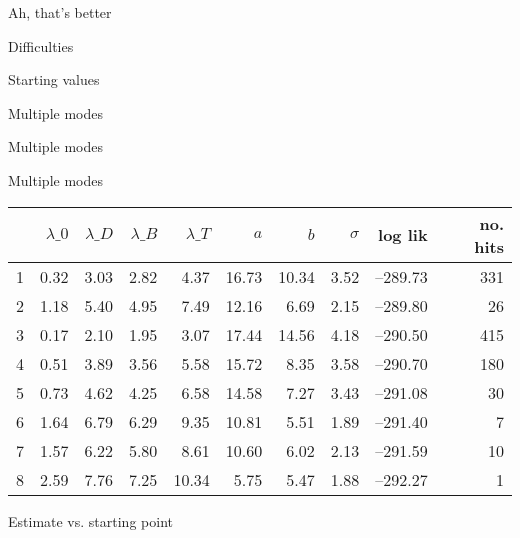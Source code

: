 \documentclass[aspectratio=169,12pt,t]{beamer}
\begin{document}
\begin{frame}{Ah, that's better}
\end{frame}


\begin{frame}{Difficulties}

\bbi
\item Starting values
\item Multiple modes
\ei

\end{frame}




\begin{frame}[c]{Multiple modes}
\end{frame}




\begin{frame}[c]{Multiple modes}

\centering
\renewcommand{\arraystretch}{1.3}
\begin{tabular}{rrrrrrrrrr}
  \hline
 & $\lambda\_0$ & $\lambda\_D$ & $\lambda\_B$ & $\lambda\_T$ & $a$ &
  $b$ & $\sigma$ & log lik & no. hits \\
  \hline
1 & 0.32 & 3.03 & 2.82 & 4.37 & 16.73 & 10.34 & 3.52 & --289.73 & 331 \\
  2 & 1.18 & 5.40 & 4.95 & 7.49 & 12.16 & 6.69 & 2.15 & --289.80 & 26 \\
  3 & 0.17 & 2.10 & 1.95 & 3.07 & 17.44 & 14.56 & 4.18 & --290.50 & 415 \\
  4 & 0.51 & 3.89 & 3.56 & 5.58 & 15.72 & 8.35 & 3.58 & --290.70 & 180 \\
  5 & 0.73 & 4.62 & 4.25 & 6.58 & 14.58 & 7.27 & 3.43 & --291.08 & 30 \\
  6 & 1.64 & 6.79 & 6.29 & 9.35 & 10.81 & 5.51 & 1.89 & --291.40 & 7 \\
  7 & 1.57 & 6.22 & 5.80 & 8.61 & 10.60 & 6.02 & 2.13 & --291.59 & 10 \\
  8 & 2.59 & 7.76 & 7.25 & 10.34 & 5.75 & 5.47 & 1.88 & --292.27 & 1 \\
   \hline
\end{tabular}

\end{frame}


\begin{frame}[c]{Estimate vs. starting point}
\end{frame}
\end{document}
